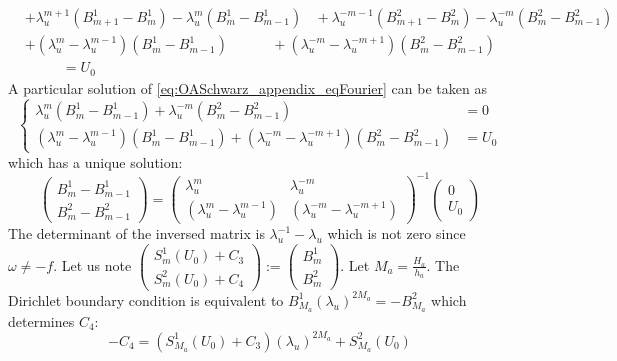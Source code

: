 \begin{appendix}
\begin{itemize}
\begin{equation}
\begin{aligned}
	&+ \lambda_u^{m+1} (B_{m+1}^1 - B_m^1)
		- \lambda_u^{m} (B_{m}^1 - B_{m-1}^1)
		~~~~+ \lambda_u^{-m-1} (B_{m+1}^2 - B_m^2)
		- \lambda_u^{-m} (B_{m}^2 - B_{m-1}^2)
		\\
	&+ (\lambda_u^m - \lambda_u^{m-1})(B_{m}^1 - B_{m-1}^1)
		~~~~~~~~~~~~~~+ (\lambda_u^{-m} - \lambda_u^{-m+1})
				(B_{m}^2 - B_{m-1}^2)\\
		&~~~~~~~~~~~~= U_0
	\end{aligned}
\end{equation}
A particular solution of \eqref{eq:OASchwarz_appendix_eqFourier}
can be taken as
\begin{equation}
\begin{cases}
	\lambda_u^m(B_m^1 - B_{m-1}^1)
	+ \lambda_u^{-m}(B_m^2 - B_{m-1}^2)&= 0 \\
	(\lambda_u^m - \lambda_u^{m-1})(B_m^1 - B_{m-1}^1)
	+ (\lambda_u^{-m} - \lambda_u^{-m+1})(B_m^2 - B_{m-1}^2)
	&= {U_0}
\end{cases}
\end{equation}
which has a unique solution:
\begin{equation}
	\begin{pmatrix}
B_m^1 - B_{m-1}^1\\
B_m^2 - B_{m-1}^2
	\end{pmatrix}
	=
	\begin{pmatrix}
		\lambda_u^m & \lambda_u^{-m} \\
		(\lambda_u^m - \lambda_u^{m-1})  & 
		(\lambda_u^{-m} - \lambda_u^{-m+1})
	\end{pmatrix}^{-1}
	\begin{pmatrix}
		0 \\ U_0
	\end{pmatrix}
\end{equation}
The determinant of the inversed matrix is
$\lambda_u^{-1} - \lambda_u$ which is not zero since
$\omega\neq -f$.
Let us note 
$\begin{pmatrix}
	S_m^1(U_0) + {C}_3\\
	S_m^2(U_0) + {C}_4
\end{pmatrix}:=\begin{pmatrix}
B_m^1\\
B_m^2
\end{pmatrix}$.
Let $M_a=\frac{H_a}{h_a}$.
The Dirichlet boundary condition is equivalent to
$B_{M_a}^1 (\lambda_u)^{2M_a} = - B_{M_a}^2$ which determines
${C}_4$:
\begin{equation}
- {C}_4 = \left(S_{M_a}^1(U_0) + {C}_3\right)
	(\lambda_u)^{2M_a} + S_{M_a}^2(U_0)
\end{equation}

\end{itemize}
\end{appendix}
